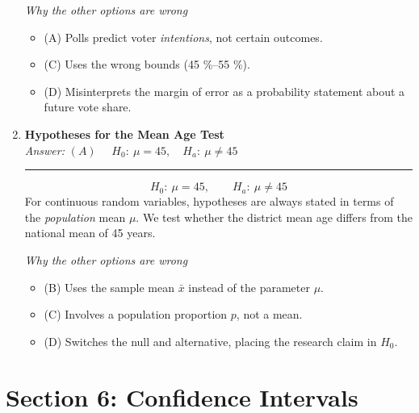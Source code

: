 \documentclass[12pt]{article}
\begin{document}
\begin{enumerate}[label=5.\arabic*]
\smallskip
\emph{Why the other options are wrong}
\begin{itemize}
  \item (A) Polls predict voter \emph{intentions}, not certain outcomes.
  \item (C) Uses the wrong bounds (45 \%–55 \%).
  \item (D) Misinterprets the margin of error as a probability statement about a future vote share.
\end{itemize}

\item \textbf{Hypotheses for the Mean Age Test}\\[2pt]

\textit{Answer:}\; $\boxed{(A)} \quad$ $H_0:\ \mu = 45, \quad H_a:\ \mu \neq 45$ \newline \noindent\hspace*{0.01cm}\rule{\linewidth}{0.1pt}
\[
  H_0:\ \mu = 45,
  \qquad
  H_a:\ \mu \neq 45
\]
For continuous random variables, hypotheses are always stated in terms of the \emph{population} mean \(\mu\).
We test whether the district mean age differs from the national mean of 45 years.

\smallskip
\emph{Why the other options are wrong}
\begin{itemize}
  \item (B) Uses the sample mean \(\bar{x}\) instead of the parameter \(\mu\).
  \item (C) Involves a population proportion \(p\), not a mean.
  \item (D) Switches the null and alternative, placing the research claim in \(H_0\).
\end{itemize}

\end{enumerate}

\section*{Section 6: Confidence Intervals}
\end{document}
